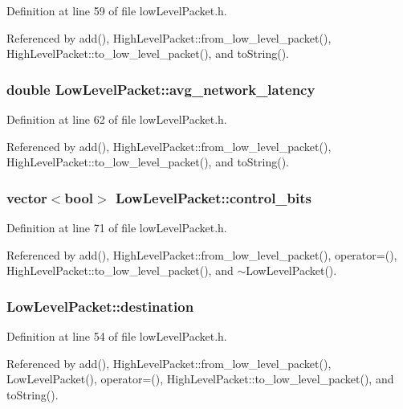 Definition at line 59 of file lowLevelPacket.h.

Referenced by add(), HighLevelPacket::from\_\-low\_\-level\_\-packet(), HighLevelPacket::to\_\-low\_\-level\_\-packet(), and toString().
\subsubsection[{avg\_\-network\_\-latency}]{\setlength{\rightskip}{0pt plus 5cm}double {\bf LowLevelPacket::avg\_\-network\_\-latency}}\label{classLowLevelPacket_9b6dc1d5e9944a52c17037ea6fd5d729}




Definition at line 62 of file lowLevelPacket.h.

Referenced by add(), HighLevelPacket::from\_\-low\_\-level\_\-packet(), HighLevelPacket::to\_\-low\_\-level\_\-packet(), and toString().
\subsubsection[{control\_\-bits}]{\setlength{\rightskip}{0pt plus 5cm}vector$<$bool$>$ {\bf LowLevelPacket::control\_\-bits}}\label{classLowLevelPacket_7537b9b0339e77d3d4a2d04998e1a950}




Definition at line 71 of file lowLevelPacket.h.

Referenced by add(), HighLevelPacket::from\_\-low\_\-level\_\-packet(), operator=(), HighLevelPacket::to\_\-low\_\-level\_\-packet(), and $\sim$LowLevelPacket().
\subsubsection[{destination}]{ {\bf LowLevelPacket::destination}}\label{classLowLevelPacket_225808b46aefe4d252c040e91c9411b0}




Definition at line 54 of file lowLevelPacket.h.

Referenced by add(), HighLevelPacket::from\_\-low\_\-level\_\-packet(), LowLevelPacket(), operator=(), HighLevelPacket::to\_\-low\_\-level\_\-packet(), and toString().
